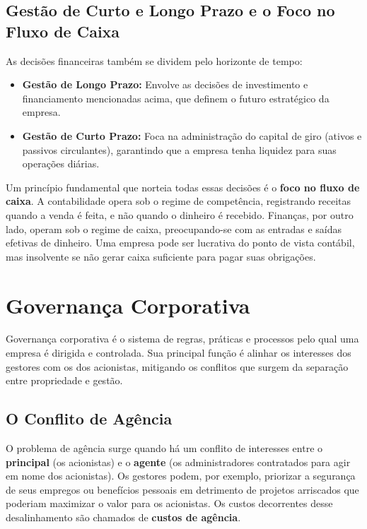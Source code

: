 \documentclass[
  a4paper,
]{book}
\providecommand{\tightlist}{%
  \setlength{\itemsep}{0pt}\setlength{\parskip}{0pt}}\usepackage{longtable,booktabs,array}
\begin{document}
\subsection{Gestão de Curto e Longo Prazo e o Foco no Fluxo de
Caixa}\label{gestuxe3o-de-curto-e-longo-prazo-e-o-foco-no-fluxo-de-caixa}

As decisões financeiras também se dividem pelo horizonte de tempo:

\begin{itemize}
\tightlist
\item
  \textbf{Gestão de Longo Prazo:} Envolve as decisões de investimento e
  financiamento mencionadas acima, que definem o futuro estratégico da
  empresa.
\item
  \textbf{Gestão de Curto Prazo:} Foca na administração do capital de
  giro (ativos e passivos circulantes), garantindo que a empresa tenha
  liquidez para suas operações diárias.
\end{itemize}

Um princípio fundamental que norteia todas essas decisões é o
\textbf{foco no fluxo de caixa}. A contabilidade opera sob o regime de
competência, registrando receitas quando a venda é feita, e não quando o
dinheiro é recebido. Finanças, por outro lado, operam sob o regime de
caixa, preocupando-se com as entradas e saídas efetivas de dinheiro. Uma
empresa pode ser lucrativa do ponto de vista contábil, mas insolvente se
não gerar caixa suficiente para pagar suas obrigações.

\section{Governança Corporativa}\label{governanuxe7a-corporativa}

Governança corporativa é o sistema de regras, práticas e processos pelo
qual uma empresa é dirigida e controlada. Sua principal função é alinhar
os interesses dos gestores com os dos acionistas, mitigando os conflitos
que surgem da separação entre propriedade e gestão.

\subsection{O Conflito de Agência}\label{o-conflito-de-aguxeancia}

O problema de agência surge quando há um conflito de interesses entre o
\textbf{principal} (os acionistas) e o \textbf{agente} (os
administradores contratados para agir em nome dos acionistas). Os
gestores podem, por exemplo, priorizar a segurança de seus empregos ou
benefícios pessoais em detrimento de projetos arriscados que poderiam
maximizar o valor para os acionistas. Os custos decorrentes desse
desalinhamento são chamados de \textbf{custos de agência}.
\end{document}
